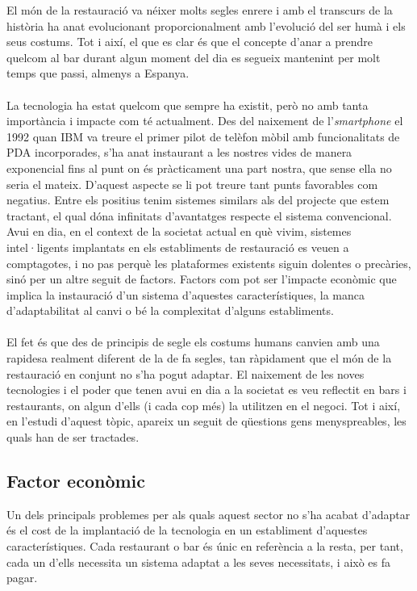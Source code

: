 El món de la restauració va néixer molts segles enrere i amb el transcurs de la història ha anat evolucionant proporcionalment amb l'evolució del ser humà i els seus costums. Tot i així, el que es clar és que el concepte d'anar a prendre quelcom al bar durant algun moment del dia es segueix mantenint per molt temps que passi, almenys a Espanya.
\\\\
La tecnologia ha estat quelcom que sempre ha existit, però no amb tanta importància i impacte com té actualment. Des del naixement de l'\textit{smartphone} \cite{smartphone} el 1992 quan IBM va treure el primer pilot de telèfon mòbil amb funcionalitats de PDA incorporades, s'ha anat instaurant a les nostres vides de manera exponencial fins al punt on és pràcticament una part nostra, que sense ella no seria el mateix. D'aquest aspecte se li pot treure tant punts favorables com negatius. Entre els positius tenim sistemes similars als del projecte que estem tractant, el qual dóna infinitats d'avantatges respecte el sistema convencional. Avui en dia, en el context de la societat actual en què vivim, sistemes intel·ligents implantats en els establiments de restauració es veuen a comptagotes, i no pas perquè les plataformes existents siguin dolentes o precàries, sinó per un altre seguit de factors. Factors com pot ser l'impacte econòmic que implica la instauració d'un sistema d'aquestes característiques, la manca d'adaptabilitat al canvi o bé la complexitat d'alguns establiments.
\\\\
El fet és que des de principis de segle els costums humans canvien amb una rapidesa realment diferent de la de fa segles, tan ràpidament que el món de la restauració en conjunt no s'ha pogut adaptar.
El naixement de les noves tecnologies i el poder que tenen avui en dia a la societat es veu reflectit en bars i restaurants, on algun d'ells (i cada cop més) la utilitzen en el negoci.
Tot i així, en l'estudi d'aquest tòpic, apareix un seguit de qüestions gens menyspreables, les quals han de ser tractades.

\subsection{Factor econòmic}

Un dels principals problemes per als quals aquest sector no s’ha acabat d’adaptar és el cost de la implantació de la tecnologia en un establiment d’aquestes característiques. Cada restaurant o bar és únic en referència a la resta, per tant, cada un d’ells necessita un sistema adaptat a les seves necessitats, i això es fa pagar.

